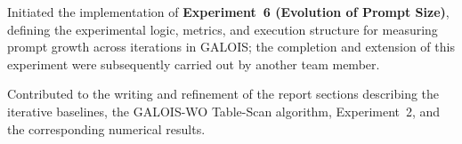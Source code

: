 \begin{itemize}[leftmargin=*]
    Initiated the implementation of \textbf{Experiment~6 (Evolution of Prompt Size)}, defining the experimental logic, metrics, and execution structure for measuring prompt growth across iterations in GALOIS; the completion and extension of this experiment were subsequently carried out by another team member.
    
    Contributed to the writing and refinement of the report sections describing the iterative baselines, the GALOIS-WO Table-Scan algorithm, Experiment~2, and the corresponding numerical results.
\end{itemize}
